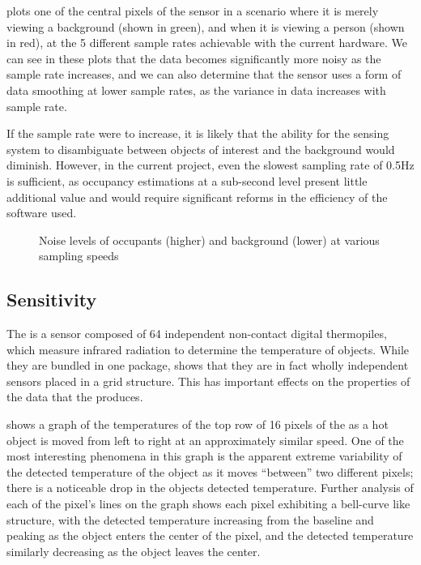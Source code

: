 \documentclass[../thesis/thesis.tex]{subfiles}
\begin{document}
 plots one of the central pixels of the sensor in a scenario where it is merely viewing a background (shown in green), and when it is viewing a person (shown in red), at the 5 different sample rates achievable with the current hardware. We can see in these plots that the data becomes significantly more noisy as the sample rate increases, and we can also determine that the sensor uses a form of data smoothing at lower sample rates, as the variance in data increases with sample rate.

If the sample rate were to increase, it is likely that the ability for the sensing system to disambiguate between objects of interest and the background would diminish. However, in the current project, even the slowest sampling rate of 0.5Hz is sufficient, as occupancy estimations at a sub-second level present little additional value and would require significant reforms in the efficiency of the software used.


\begin{figure}
  \centering
\caption{Noise levels of occupants (higher) and background (lower) at various sampling speeds}
\label{fig:noise}
\end{figure}


\subsection{Sensitivity}

The \mlx is a sensor composed of 64 independent non-contact digital thermopiles, which measure infrared radiation to determine the temperature of objects. While they are bundled in one package,  shows that they are in fact wholly independent sensors placed in a grid structure. This has important effects on the properties of the data that the \mlx produces. 

 shows a graph of the temperatures of the top row of 16 pixels of the \mlx as a hot object is moved from left to right at an approximately similar speed. One of the most interesting phenomena in this graph is the apparent extreme variability of the detected temperature of the object as it moves ``between'' two different pixels; there is a noticeable drop in the objects detected temperature. Further analysis of each of the pixel's lines on the graph shows each pixel exhibiting a bell-curve like structure, with the detected temperature increasing from the baseline and peaking as the object enters the center of the pixel, and the detected temperature similarly decreasing as the object leaves the center. 
\end{document}
